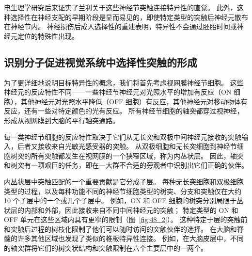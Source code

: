 电生理学研究后来证实了兰利关于这些神经节突触连接特异性的直觉。
此外，这种选择性在神经支配的早期阶段是显而易见的，即使特定类型的突触后神经元散布在神经节内。
神经损伤后成人选择性的重建表明，特异性不会通过胚胎时间或神经元定位的特殊性出现。



\subsection{识别分子促进视觉系统中选择性突触的形成}

为了更详细地说明目标特异性的概念，我们将首先考虑视网膜神经节细胞。
这些神经元的反应特性不同——一些神经节神经元对光照水平的增加有反应（ON 细胞），其他神经元对光照水平降低（OFF 细胞）有反应，其他神经元对移动物体有反应，还有一些对特定颜色的光有反应。
所有神经节细胞的轴突都穿过视神经，形成从视网膜到大脑的平行轴突通路。


每一类神经节细胞的反应特性取决于它们从无长突和双极中间神经元接收的突触输入，后者又接收来自光敏光感受器的突触。
从双极细胞和无长突细胞到神经节细胞树突的所有突触都发生在视网膜的一个狭窄区域，称为内丛状层。
因此，轴突和树突有一项艰巨的任务，即在一大群不合适的旁观者中识别出它们正确的伙伴。


内丛状层中突触匹配的一个重要贡献是它分成子层。
每种无长突细胞和双极细胞类型的过程，以及每种功能不同的神经节细胞类型的树突、分支和突触仅在大约 10 个子层中的一个或几个子层中。
例如，ON 和 OFF 细胞的树突分别局限于丛状层的内部和外部，因此接收来自不同中间神经元的突触；
特定类型的 ON 和 OFF 单元在这些区域内具有更窄的限制（图~\ref{fig:48_2}）。
这种特定于层的突触前和突触后过程的树枝化限制了他们可以随时访问的突触伙伴的选择。
在大脑和脊髓的许多其他区域也发现了类似的椎板特异性连接。
例如，在大脑皮层中，不同的轴突群将它们的树突状结构和突触限制在六个主要层中的一两个。


